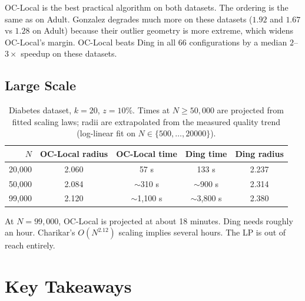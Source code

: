 \documentclass[11pt]{article}
\begin{document}
OC-Local is the best practical algorithm on both datasets. The ordering is the same as on Adult. Gonzalez degrades much more on these datasets ($1.92$ and $1.67$ vs $1.28$ on Adult) because their outlier geometry is more extreme, which widens OC-Local's margin. OC-Local beats Ding in all 66 configurations by a median $2$--$3\times$ speedup on these datasets.

\subsection{Large Scale}

\begin{table}[H]
\centering
\begin{tabular}{rcccc}
\toprule
$N$ & OC-Local radius & OC-Local time & Ding time & Ding radius \\
\midrule
20{,}000 & 2.060 & 57 s          & 133 s          & 2.237 \\
50{,}000 & 2.084 & $\sim$310 s   & $\sim$900 s    & 2.314 \\
99{,}000 & 2.120 & $\sim$1{,}100 s & $\sim$3{,}800 s & 2.380 \\
\bottomrule
\end{tabular}
\caption{Diabetes dataset, $k=20$, $z=10\%$. Times at $N \ge 50{,}000$ are
projected from fitted scaling laws; radii are extrapolated from the
measured quality trend (log-linear fit on $N \in \{500,\dots,20000\}$).}
\end{table}

At $N = 99{,}000$, OC-Local is projected at about 18 minutes. Ding needs roughly an hour. Charikar's $O(N^{2.12})$ scaling implies several hours. The LP is out of reach entirely.


\section{Key Takeaways}
\end{document}
